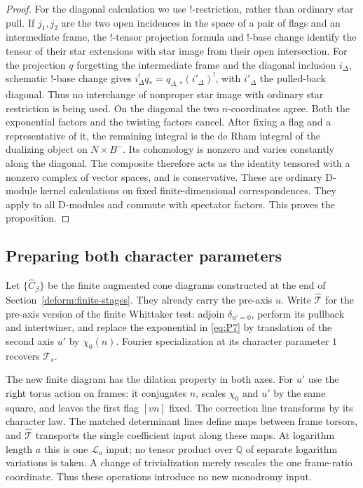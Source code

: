 \documentclass[11pt]{article}
\numberwithin{equation}{section}
\theoremstyle{definition}
\theoremstyle{remark}
\begin{document}
\begin{proof}
For the diagonal calculation we use $!$-restriction, rather than
ordinary star pull.  If $j_1,j_2$ are the two open incidences in the
space of a pair of flags and an intermediate frame, the $!$-tensor
projection formula and $!$-base change identify the tensor of their
star extensions with star image from their open intersection.
For the projection $q$ forgetting the intermediate frame and the
diagonal inclusion $i_\Delta$, schematic $!$-base change gives
$i_\Delta^!q_*=q_{\Delta,*}(i'_\Delta)^!$, with $i'_\Delta$ the pulled-back
diagonal.  Thus no interchange of nonproper star image with ordinary
star restriction is being used.
On the diagonal the two $n$-coordinates agree.  Both the exponential
factors and the twisting factors cancel.  After fixing a flag and a
representative of it, the remaining integral is the de Rham integral of
the dualizing object on $N\times B^-$.  Its cohomology is nonzero and
varies constantly along the diagonal.  The composite therefore acts as
the identity tensored with a nonzero complex of vector spaces, and is
conservative.  These are ordinary D-module kernel calculations on fixed
finite-dimensional correspondences.  They apply to all D-modules and
commute with spectator factors.  This proves the proposition.
\end{proof}

\subsection{Preparing both character parameters}
\label{planch:two-axes}

Let $\{\widehat C_\beta\}$ be the finite augmented cone diagrams
constructed at the end of Section~\ref{deform:finite-stages}.  They
already carry the pre-axis $u$.  Write $\widehat{\mathcal T}$ for the
pre-axis version of the finite Whittaker test: adjoin
$\delta_{u'=0}$, perform its pullback and intertwiner, and replace the
exponential in \eqref{eq:P7} by translation of the second axis $u'$ by
$\chi_0(n)$.  Fourier specialization at its character parameter $1$
recovers $\mathcal T_s$.

The new finite diagram has the dilation property in both axes.  For
$u'$ use the right torus action on frames: it conjugates $n$, scales
$\chi_0$ and $u'$ by the same square, and leaves the first flag $[vn]$
fixed.  The correction line transforms by its character law.  The
matched determinant lines define maps between frame torsors, and
$\widehat{\mathcal T}$ transports the single coefficient input along
these maps.  At logarithm length $a$ this is one $\mathcal L_a$ input;
no tensor product over $\mathbb Q$ of separate logarithm variations is
taken.  A change of trivialization merely rescales the one frame-ratio
coordinate.  Thus these operations introduce no new monodromy input.
\end{document}
